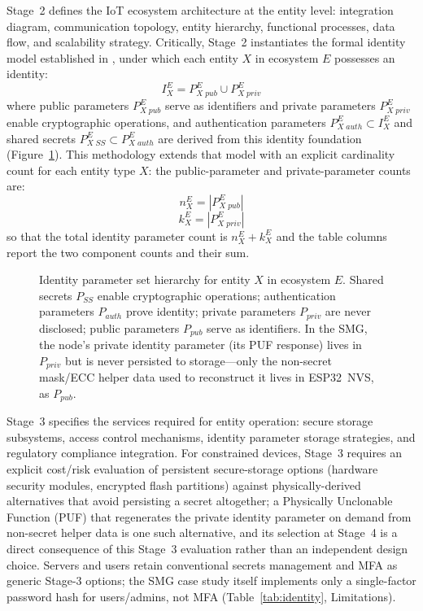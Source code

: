 \documentclass[preprint,12pt,authoryear]{elsarticle}
\begin{document}
Stage~2 defines the IoT ecosystem architecture at the entity level: integration diagram, communication topology, entity hierarchy, functional processes, data flow, and scalability strategy. Critically, Stage~2 instantiates the formal identity model established in \citet{campos2026identity}, under which each entity $X$ in ecosystem $E$ possesses an identity:
\begin{equation}
    I^E_X = P^E_{X\;pub} \cup P^E_{X\;priv}
\end{equation}
where public parameters $P^E_{X\;pub}$ serve as identifiers and private parameters $P^E_{X\;priv}$ enable cryptographic operations, and authentication parameters $P^E_{X\;auth} \subset I^E_X$ and shared secrets $P^E_{X\;SS} \subset P^E_{X\;auth}$ are derived from this identity foundation (Figure~\ref{fig:identidad}). This methodology extends that model with an explicit cardinality count for each entity type $X$: the public-parameter and private-parameter counts are:
\begin{equation}
    n^E_X = |P^E_{X\;pub}|
\end{equation}
\begin{equation}
    k^E_X = |P^E_{X\;priv}|
\end{equation}
so that the total identity parameter count is $n^E_X + k^E_X$ and the table columns report the two component counts and their sum.

\begin{figure}[htbp]
    \centering
    
    \caption{Identity parameter set hierarchy for entity $X$ in ecosystem $E$. Shared secrets $P_{SS}$ enable cryptographic operations; authentication parameters $P_{auth}$ prove identity; private parameters $P_{priv}$ are never disclosed; public parameters $P_{pub}$ serve as identifiers. In the SMG, the node's private identity parameter (its PUF response) lives in $P_{priv}$ but is never persisted to storage---only the non-secret mask/ECC helper data used to reconstruct it lives in ESP32~NVS, as $P_{pub}$.}
    \label{fig:identidad}
\end{figure}

Stage~3 specifies the services required for entity operation: secure storage subsystems, access control mechanisms, identity parameter storage strategies, and regulatory compliance integration. For constrained devices, Stage~3 requires an explicit cost/risk evaluation of persistent secure-storage options (hardware security modules, encrypted flash partitions) against physically-derived alternatives that avoid persisting a secret altogether; a Physically Unclonable Function (PUF) that regenerates the private identity parameter on demand from non-secret helper data is one such alternative, and its selection at Stage~4 is a direct consequence of this Stage~3 evaluation rather than an independent design choice. Servers and users retain conventional secrets management and MFA as generic Stage-3 options; the SMG case study itself implements only a single-factor password hash for users/admins, not MFA (Table~\ref{tab:identity}, Limitations).
\end{document}
